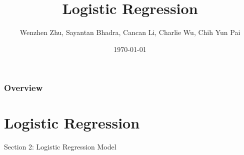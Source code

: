 \documentclass{beamer}
\title[Logistic Regression]{Logistic Regression} %
\author{Wenzhen Zhu, Sayantan Bhadra, Cancan Li, Charlie Wu, Chih Yun Pai} %
\institute[WUSTL] %
{
Washington University in St. Louis \\ %
\medskip
\textit{CSE 543T} %
}
\date{\today} %
\begin{document}
\begin{frame}
\titlepage %
\end{frame}

\begin{frame}
\frametitle{Overview} %
\tableofcontents %
\end{frame}
\section{Logistic Regression} 

\begin{frame}
\huge{\centerline{Section 2: Logistic Regression Model}}
\end{frame}
\end{document}
